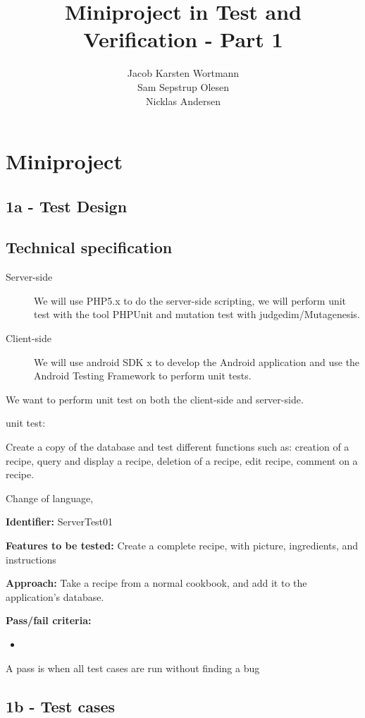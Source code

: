 \documentclass[a4paper,12pt]{memoir}
\title{Miniproject in Test and Verification - Part 1}
\author{Jacob Karsten Wortmann\\Sam Sepstrup Olesen\\Nicklas Andersen}
\newcommand{\testdesign}[4]
{
\begin{framed}
\begin{description}
\item \textbf{Identifier:} #1
\item \textbf{Features to be tested:} #2
\item \textbf{Approach:} #3
\item \textbf{Pass/fail criteria:} #4
\end{description}
\end{framed}
}
\begin{document}
\maketitle
\chapter*{Miniproject}
\section*{1a - Test Design}
\section{Technical specification}
\begin{description}
    \item[Server-side]
        We will use PHP5.x to do the server-side scripting,
        we will perform unit test with the tool PHPUnit and mutation test with judgedim/Mutagenesis.
    \item[Client-side]
        We will use android SDK x to develop the Android application and use the Android Testing Framework to perform unit tests.
\end{description}

We want to perform unit test on both the client-side and server-side.

unit test:

Create a copy of the database and test different functions such as: creation of a recipe, query and display a recipe, deletion of a recipe, edit recipe, comment on a recipe.

Change of language, 


\testdesign
{ServerTest01}
{Create a complete recipe, with picture, ingredients, and instructions}
{Take a recipe from a normal cookbook, and add it to the application's database.}
{\begin{itemize}[nolistsep]
\item
\end{itemize}}
{A pass is when all test cases are run without finding a bug}




\section*{1b - Test cases}
\end{document}
